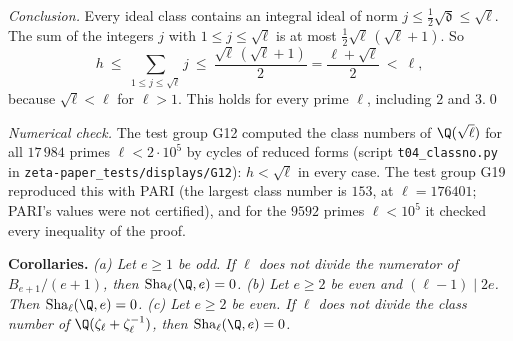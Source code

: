 \documentclass[11pt,letterpaper]{article}
\begin{document}
\emph{Conclusion.} Every ideal class contains an integral ideal of norm $j\le\tfrac12\sqrt{\mathfrak d}\le\sqrt\ell$.
The sum of the integers $j$ with $1\le j\le\sqrt\ell$ is at most $\tfrac12\sqrt\ell\,(\sqrt\ell+1)$. So
\begin{equation}\label{D:344}
 h\ \le\ \sum_{1\le j\le\sqrt\ell}j\ \le\ \frac{\sqrt\ell\,(\sqrt\ell+1)}2=\frac{\ell+\sqrt\ell}2\ <\ \ell ,
\end{equation}
because $\sqrt\ell<\ell$ for $\ell>1$. This holds for every prime $\ell$, including $2$ and $3$.\qed

\emph{Numerical check.} The test group G12 computed the class numbers of
$\Q(\sqrt\ell)$ for all $17\,984$ primes $\ell<2\cdot10^5$ by cycles of reduced forms (script
\texttt{t04\_classno.py} in \texttt{zeta-paper\_tests/displays/G12}): $h<\sqrt\ell$ in every case. The test
group G19 reproduced this with PARI (the largest class number is $153$, at $\ell=176401$; PARI's values
were not certified), and for the $9592$ primes $\ell<10^5$ it checked every inequality of the proof.

\textbf{Corollaries.} \emph{\textup{(a)} Let $e\ge1$ be odd. If $\ell$ does not divide the numerator of
$B_{e+1}/(e+1)$, then $\mathrm{Sha}_\ell(\Q,e)=0$. \textup{(b)} Let $e\ge2$ be even and $(\ell-1)\mid2e$. Then
$\mathrm{Sha}_\ell(\Q,e)=0$. \textup{(c)} Let $e\ge2$ be even. If $\ell$ does not divide the class number of
$\Q(\zeta_\ell+\zeta_\ell^{-1})$, then $\mathrm{Sha}_\ell(\Q,e)=0$.}
\end{document}
